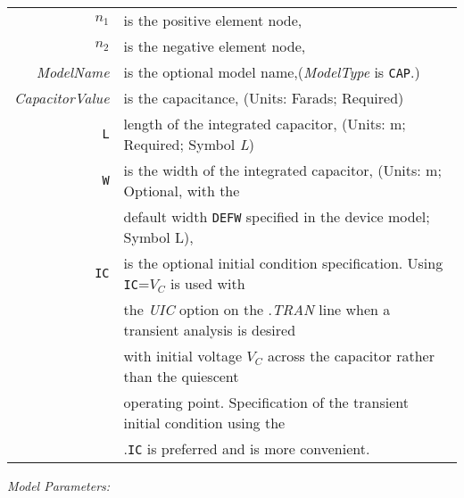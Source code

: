 \begin{tabular}{r l}
$n_1$ & is the positive element node, \\
$n_2$ & is the negative element node, \\
\textit{ModelName} & is the optional model name,(\textit{ModelType} is \texttt{CAP}.) \\
\textit{CapacitorValue} & is the capacitance, (Units: Farads; Required) \\
\texttt{L}   & length of the integrated capacitor, (Units: m; Required; Symbol \textit{L}) \\
\texttt{W}   & is the width of the integrated capacitor, (Units: m; Optional, with the \\
             & default width \texttt{DEFW} specified in the device model; Symbol {L}), \\
\texttt{IC}  & is the optional initial condition specification. Using \texttt{IC}=$V_C$ is used with \\
             & the \textit{UIC} option on the .\textit{TRAN} line when a transient analysis is desired  \\
             & with initial voltage $V_C$ across the capacitor rather than the quiescent  \\
             & operating point. Specification of  the transient initial condition using the  \\
             & .\texttt{IC} is preferred and is more convenient.
\end{tabular}
\newline
\textit{Model Parameters:}
\newline

